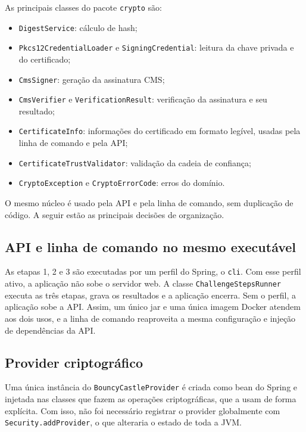 \documentclass[12pt,a4paper]{article}
\begin{document}
As principais classes do pacote \texttt{crypto} são:

\begin{itemize}
    \item \texttt{DigestService}: cálculo de hash;
    \item \texttt{Pkcs12CredentialLoader} e \texttt{SigningCredential}: leitura da chave privada e do certificado;
    \item \texttt{CmsSigner}: geração da assinatura CMS;
    \item \texttt{CmsVerifier} e \texttt{VerificationResult}: verificação da assinatura e seu resultado;
    \item \texttt{CertificateInfo}: informações do certificado em formato legível, usadas pela linha de comando e pela API;
    \item \texttt{CertificateTrustValidator}: validação da cadeia de confiança;
    \item \texttt{CryptoException} e \texttt{CryptoErrorCode}: erros do domínio.
\end{itemize}

O mesmo núcleo é usado pela API e pela linha de comando, sem duplicação de código. A seguir estão as principais decisões de organização.

\subsection{API e linha de comando no mesmo executável}

As etapas 1, 2 e 3 são executadas por um perfil do Spring, o \texttt{cli}. Com esse perfil ativo, a aplicação não sobe o servidor web. A classe \texttt{ChallengeStepsRunner} executa as três etapas, grava os resultados e a aplicação encerra. Sem o perfil, a aplicação sobe a API. Assim, um único jar e uma única imagem Docker atendem aos dois usos, e a linha de comando reaproveita a mesma configuração e injeção de dependências da API.

\subsection{Provider criptográfico}

Uma única instância do \texttt{BouncyCastleProvider} é criada como bean do Spring e injetada nas classes que fazem as operações criptográficas, que a usam de forma explícita. Com isso, não foi necessário registrar o provider globalmente com \texttt{Security.addProvider}, o que alteraria o estado de toda a JVM.
\end{document}
